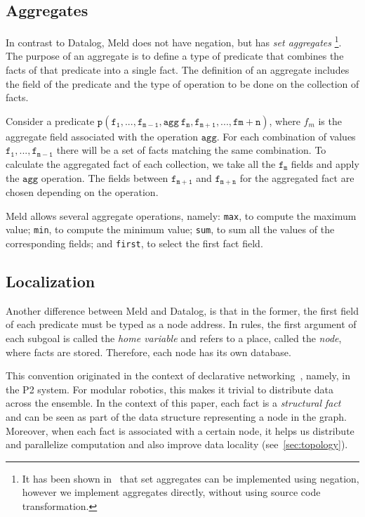 \documentclass[preprint]{sigplanconf}
\begin{document}
\subsection{Aggregates}

In contrast to Datalog, Meld does not have negation, but has \emph{set aggregates}
\footnote{It has been shown in~\cite{zaniolo-arni-ong-dood93} that set aggregates can be
implemented using negation, however we implement aggregates directly, without using source
code transformation.}. The purpose of an aggregate is to define a type of predicate that combines
the facts of that predicate into a single fact. The definition of an aggregate includes the
field of the predicate and the type of operation to be done on the collection of facts.

Consider a predicate $\mathtt{p(f_1, ..., f_{m-1}, agg\ f_{m}, f_{m+1}, ..., f{m+n})}$,
where $f_m$ is the aggregate field associated with the operation $\mathtt{agg}$. For each
combination of values $\mathtt{f_1, ..., f_{m-1}}$ there will be a set of facts matching
the same combination. To calculate the aggregated fact of each collection, we take all
the $\mathtt{f_{m}}$ fields and apply the $\mathtt{agg}$ operation. The fields between
$\mathtt{f_{m+1}}$ and $\mathtt{f_{m+n}}$ for the aggregated fact are chosen depending
on the operation.

Meld allows several aggregate operations, namely: \texttt{max}, to compute the maximum value;
\texttt{min}, to compute the minimum value; \texttt{sum}, to sum all the values of the corresponding
fields; and \texttt{first}, to select the first fact field.

\subsection{Localization}\label{sec:localization}

Another difference between Meld and Datalog, is that in the former, the first field
of each predicate must be typed as a node address.
In rules, the first argument of each subgoal is called the \emph{home variable} and
refers to a place, called the \emph{node}, where facts are stored.
Therefore, each node has its own database.

This convention originated in the context of declarative networking~\cite{Loo-condie-garofalakis-p2},
namely, in the P2 system. For modular robotics, this makes it trivial to
distribute data across the ensemble. In the context of this paper, each fact is a
\emph{structural fact} and can be seen as part of the data structure representing a node in the graph.
Moreover, when each fact is associated with a certain node, it helps us distribute
and parallelize computation and also improve data locality (see~\ref{sec:topology}).
\end{document}
